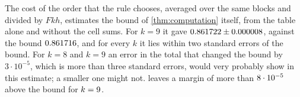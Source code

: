 The cost of the order that the rule chooses, averaged over the same blocks and divided by $Fkh$, estimates the bound of \cref{thm:computation} itself, from the table alone and without the cell sums. For $k=9$ it gave $0.861722\pm0.000008$, against the bound $0.861716$, and for every $k$ it lies within two standard errors of the bound. For $k=8$ and $k=9$ an error in the total that changed the bound by $3\cdot10^{-5}$, which is more than three standard errors, would very probably show in this estimate; a smaller one might not.  leaves a margin of more than $8\cdot10^{-5}$ above the bound for $k=9$.
